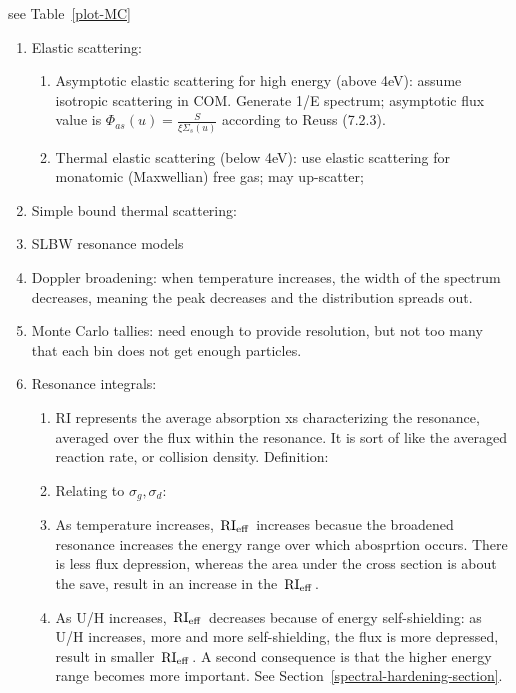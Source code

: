 \documentclass{school-22.211-notes}
\begin{document}
 see Table~\ref{plot-MC}
\begin{enumerate}
\item Elastic scattering:
  \begin{enumerate}
  \item Asymptotic elastic scattering for high energy (above 4eV): assume isotropic scattering in COM. Generate 1/E spectrum; asymptotic flux value is $\Phi_{as} (u) = \frac{S}{\xi \Sigma_s (u)}$ according to Reuss (7.2.3). 
  \item Thermal elastic scattering (below 4eV): use elastic scattering for monatomic (Maxwellian) free gas; may up-scatter;
  \end{enumerate}
\item Simple bound thermal scattering: 
\item SLBW resonance models
\item Doppler broadening: when temperature increases, the width of the spectrum decreases, meaning the peak decreases and the distribution spreads out. 
\item Monte Carlo tallies: need enough to provide resolution, but not too many that each bin does not get enough particles. 
\item Resonance integrals: 
  \begin{enumerate}
  \item RI represents the average absorption xs characterizing the resonance, averaged over the flux within the resonance. It is sort of like the averaged reaction rate, or collision density. Definition:
  \item Relating to $\sigma_g, \sigma_d$: 
  \item As temperature increases, $\left. \mathrm{RI}_{\mathrm{eff}} \right.$ increases becasue the broadened resonance increases the energy range over which abosprtion occurs. There is less flux depression, whereas the area under the cross section is about the save, result in an increase in the $\left. \mathrm{RI}_{\mathrm{eff}} \right.$.
  \item As U/H increases, $\left. \mathrm{RI}_{\mathrm{eff}} \right.$ decreases because of energy self-shielding: as U/H increases, more and more self-shielding, the flux is more depressed, result in smaller $\left. \mathrm{RI}_{\mathrm{eff}} \right.$. A second consequence is that the higher energy range becomes more important. See Section~\ref{spectral-hardening-section}. 

\end{enumerate}
\end{enumerate}
\end{document}
